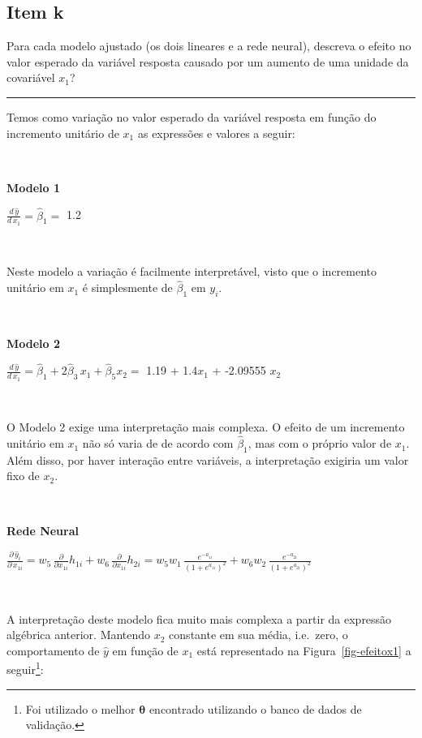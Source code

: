 \documentclass[
  a4paperpaper,
]{article}
\begin{document}
\subsection{Item k}\label{item-k}

Para cada modelo ajustado (os dois lineares e a rede neural), descreva o
efeito no valor esperado da variável resposta causado por um aumento de
uma unidade da covariável \(x_1\)?

\begin{center}\rule{0.5\linewidth}{0.5pt}\end{center}

Temos como variação no valor esperado da variável resposta em função do
incremento unitário de \(x_1\) as expressões e valores a seguir:

~

\textbf{Modelo 1}

\(\frac{d \, \hat{y}}{d \, x_1} = \hat{\beta}_1 =\) 1.2

~

Neste modelo a variação é facilmente interpretável, visto que o
incremento unitário em \(x_1\) é simplesmente de \(\hat{\beta}_1\) em
\(y_i\).

~

\textbf{Modelo 2}

\(\frac{d \, \hat{y}}{d \, x_1} = \hat{\beta}_1 + 2\hat{\beta}_3 \, x_1 + \hat{\beta}_5 x_2 =\)
1.19 + 1.4\(x_1\) + -2.09555 \(x_2\)

~

O Modelo 2 exige uma interpretação mais complexa. O efeito de um
incremento unitário em \(x_1\) não só varia de de acordo com
\(\hat{\beta}_1\), mas com o próprio valor de \(x_1\). Além disso, por
haver interação entre variáveis, a interpretação exigiria um valor fixo
de \(x_2\).

~

\textbf{Rede Neural}

\(\frac{\partial \, \hat{y}_i}{\partial \, x_{1i}} = w_5 \, \frac{\partial}{\partial x_{1i}} h_{1i} + w_6\, \frac{\partial}{\partial x_{1i}} h_{2i} = w_5w_1 \, \frac{e^{-a_{1i}}}{(1+e^{a_{1i}})^2} + w_6w_2 \, \frac{e^{-a_{2i}}}{(1+e^{a_{2i}})^2}\)

~

A interpretação deste modelo fica muito mais complexa a partir da
expressão algébrica anterior. Mantendo \(x_2\) constante em sua média,
i.e.~zero, o comportamento de \(\hat{y}\) em função de \(x_1\) está
representado na Figura~\ref{fig-efeitox1} a seguir\footnote{Foi
  utilizado o melhor \(\boldsymbol{\theta}\) encontrado utilizando o
  banco de dados de validação.}:
\end{document}
